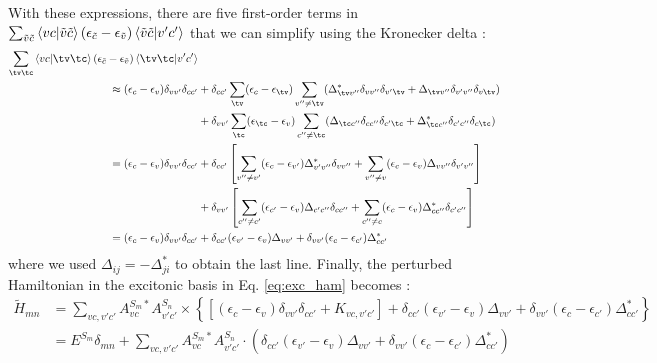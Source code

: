 With these expressions, there are five first-order terms in $\sum_{\Tilde{v}\tilde{c}} \bra{vc}\ket{\Tilde{v}\Tilde{c}} (\epsilon_{\Tilde{c}} - \epsilon_{\Tilde{v}})\bra{\Tilde{v}\Tilde{c}}\ket{v'c'}$ that we can simplify using the Kronecker delta :
\begin{align}
    \sum_{\tv\tc} \bra{vc}\ket{\tv\tc} (\epsilon_{\Tilde{c}} - \epsilon_{\Tilde{v}})\bra{\tv\tc}\ket{v'c'} \nonumber \\
        \approx (\epsilon_c - \epsilon_v)\delta_{vv'}\delta_{cc'} &+ \delta_{cc'}\sum_{\tv}(\epsilon_c - \epsilon_{\tv}) \sum_{v''\neq \tv} (\Delta^*_{\tv v''}\delta_{vv''}\delta_{v'\tv} + \Delta_{\tv v''}\delta_{v'v''}\delta_{v\tv}) \nonumber \\
        &+  \delta_{vv'} \sum_{\tc} (\epsilon_{\tc} - \epsilon_v) \sum_{c'' \neq\tc} (\Delta_{\tc c''}\delta_{cc''}\delta_{c'\tc} + \Delta^*_{\tc c''}\delta_{c'c''}\delta_{c\tc}) \nonumber \\
        = (\epsilon_c - \epsilon_v)\delta_{vv'}\delta_{cc'} &+ \delta_{cc'} \left[  \sum_{v''\neq v'} (\epsilon_c - \epsilon_{v'}) \Delta^*_{v'v''}\delta_{v v''} + \sum_{v'' \neq v} (\epsilon_c - \epsilon_v) \Delta_{vv''} \delta_{v'v''} \right] \nonumber \\
        &+  \delta_{vv'} \left[ \sum_{c''\neq c'} (\epsilon_{c'} - \epsilon_v)\Delta_{c' c''}\delta_{cc''} + \sum_{c''\neq c} (\epsilon_c - \epsilon_v) \Delta^*_{cc''}\delta_{c'c''} \right] \nonumber \\
    = (\epsilon_c - \epsilon_v) \delta_{vv'}\delta_{cc'} &+ \delta_{cc'}(\epsilon_{v'} - \epsilon_v) \Delta_{vv'} + \delta_{vv'}(\epsilon_c - \epsilon_{c'}) \Delta^*_{cc'}
\end{align}
where we used $\Delta_{ij} = -\Delta_{ji}^*$ to obtain the last line. Finally, the perturbed Hamiltonian in the excitonic basis in Eq. \eqref{eq:exc_ham} becomes :
\begin{align}
    \tilde{H}_{mn} &= \sum_{vc,v'c'} A^{S_m *}_{vc} A^{S_n}_{v'c'} \times \left\{ \left[ (\epsilon_c - \epsilon_v) \delta_{vv'}\delta_{cc'} + K_{vc,v'c'} \right] + \delta_{cc'} (\epsilon_{v'} - \epsilon_v)\Delta_{vv'} + \delta_{vv'}(\epsilon_c - \epsilon_{c'}) \Delta_{cc'}^*  \right\} \nonumber \\
    &= E^{S_m}\delta_{mn} + \sum_{vc,v'c'} A^{S_m*}_{vc} A^{S_n}_{v'c'} \cdot \left( \delta_{cc'}(\epsilon_{v'} - \epsilon_v) \Delta_{vv'}  + \delta_{vv'} (\epsilon_c - \epsilon_{c'}) \Delta^*_{cc'} \right) \label{eq:perturb_H_exc}
\end{align}
